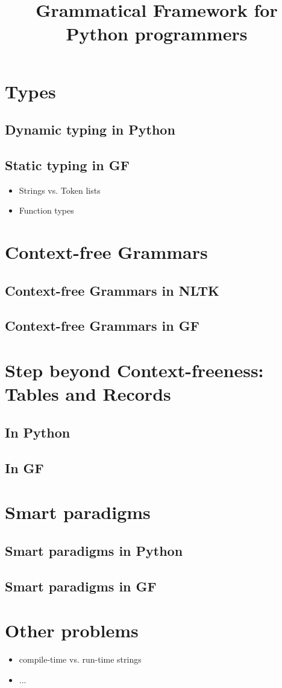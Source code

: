 \documentclass{scrartcl}
\title{Grammatical Framework for Python programmers}
\begin{document}
\maketitle
\section{Types}
\subsection{Dynamic typing in Python}
\subsection{Static typing in GF}
\begin{itemize}
\item Strings vs. Token lists
\item Function types
\end{itemize}
\section{Context-free Grammars}
\subsection{Context-free Grammars in NLTK}
\subsection{Context-free Grammars in GF}
\section{Step beyond Context-freeness: Tables and Records}
\subsection{In Python}
\subsection{In GF}
\section{Smart paradigms}
\subsection{Smart paradigms in Python}
\subsection{Smart paradigms in GF}
\section{Other problems}
\begin{itemize}
\item compile-time vs. run-time strings
\item ...
\end{itemize}
\end{document}

